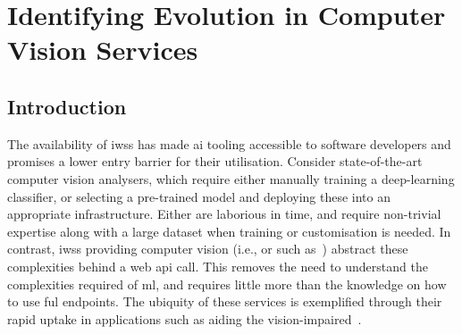 \chapter[Identifying Evolution in Computer Vision Services]
{Identifying Evolution in Computer Vision Services}
\label{ch:icsme2019}
\graphicspath{{mainmatter/publications/figures/icsme2019/}}

\def \googleapi {A}
\def \azureapi {B}
\def \awsapi {C}

\glsresetall
\begin{abstract}
Recent advances in \gls{ai} and \gls{ml}, such as computer vision, are now available as \glspl{iws} and their accessibility and simplicity is compelling. Multiple vendors now offer this technology as cloud services and developers want to leverage these advances to provide value to end-users. 
However, there is no firm investigation into the maintenance and evolution risks arising from use of these \glspl{iws}; in particular, their behavioural consistency and transparency of their functionality.
We evaluated the responses of three different \glspl{iws} (specifically computer vision) over 11 months using 3 different datasets, verifying responses against the respective documentation and assessing evolution risk. 
We found that there are: (1)~inconsistencies in how these services behave; (2)~evolution risk in the responses; and (3)~a lack of clear communication that documents these risks and inconsistencies.
We propose a set of recommendations to both developers and \gls{iws} providers to inform risk and assist maintainability.
\end{abstract}
\glsresetall


\section{Introduction}

The availability of \glspl{iws} has made \gls{ai} tooling accessible to software developers and promises a lower entry barrier for their utilisation. Consider state-of-the-art computer vision analysers, which require either manually training a deep-learning classifier, or selecting a pre-trained model and deploying these into an appropriate infrastructure. Either are laborious in time, and require non-trivial expertise along with a large dataset when training or customisation is needed.
In contrast, \glspl{iws} providing computer vision (i.e.,  or  such as~) abstract these complexities behind a web \gls{api} call. This removes the need to understand the complexities required of \gls{ml}, and requires little more than the knowledge on how to use ful endpoints. The ubiquity of these services is exemplified through their rapid uptake in applications such as aiding the vision-impaired~\citep{Reis:2018cp,daMotaSilveira:2017vp}.

